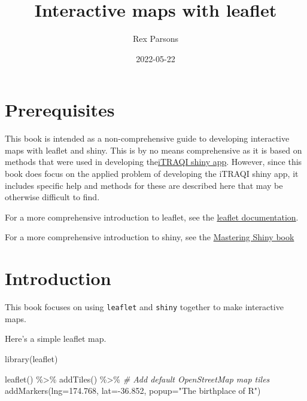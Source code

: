 \documentclass[
]{book}
\title{Interactive maps with leaflet}
\author{Rex Parsons}
\date{2022-05-22}
\newenvironment{Shaded}{\begin{snugshade}}{\end{snugshade}}
\newcommand{\AttributeTok}[1]{\textcolor[rgb]{0.77,0.63,0.00}{#1}}
\newcommand{\CommentTok}[1]{\textcolor[rgb]{0.56,0.35,0.01}{\textit{#1}}}
\newcommand{\FloatTok}[1]{\textcolor[rgb]{0.00,0.00,0.81}{#1}}
\newcommand{\FunctionTok}[1]{\textcolor[rgb]{0.00,0.00,0.00}{#1}}
\newcommand{\NormalTok}[1]{#1}
\newcommand{\SpecialCharTok}[1]{\textcolor[rgb]{0.00,0.00,0.00}{#1}}
\newcommand{\StringTok}[1]{\textcolor[rgb]{0.31,0.60,0.02}{#1}}
\begin{document}
\maketitle

{
\setcounter{tocdepth}{1}
\tableofcontents
}
\hypertarget{prerequisites}{%
\chapter{Prerequisites}\label{prerequisites}}

This book is intended as a non-comprehensive guide to developing interactive maps with leaflet and shiny. This is by no means comprehensive as it is based on methods that were used in developing the\href{https://access.healthequity.link/}{iTRAQI shiny app}. However, since this book does focus on the applied problem of developing the iTRAQI shiny app, it includes specific help and methods for these are described here that may be otherwise difficult to find.

For a more comprehensive introduction to leaflet, see the
\href{https://rstudio.github.io/leaflet/}{leaflet documentation}.

For a more comprehensive introduction to shiny, see the
\href{https://mastering-shiny.org/}{Mastering Shiny book}

\hypertarget{intro}{%
\chapter{Introduction}\label{intro}}

This book focuses on using \texttt{leaflet} and \texttt{shiny} together to make interactive maps.

Here's a simple leaflet map.

\begin{Shaded}
\begin{Highlighting}[]
\FunctionTok{library}\NormalTok{(leaflet)}

\FunctionTok{leaflet}\NormalTok{() }\SpecialCharTok{\%\textgreater{}\%}
  \FunctionTok{addTiles}\NormalTok{() }\SpecialCharTok{\%\textgreater{}\%}  \CommentTok{\# Add default OpenStreetMap map tiles}
  \FunctionTok{addMarkers}\NormalTok{(}\AttributeTok{lng=}\FloatTok{174.768}\NormalTok{, }\AttributeTok{lat=}\SpecialCharTok{{-}}\FloatTok{36.852}\NormalTok{, }\AttributeTok{popup=}\StringTok{"The birthplace of R"}\NormalTok{)}
\end{Highlighting}
\end{Shaded}
\end{document}
